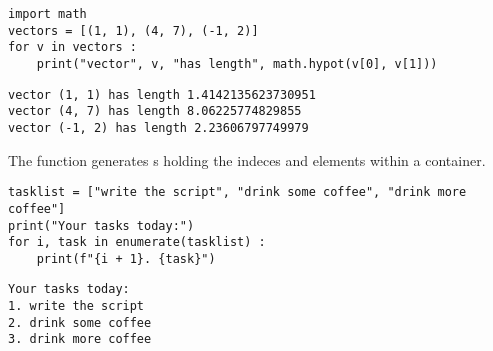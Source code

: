 
\begin{frame}[fragile]
%
\begin{codebox}
\begin{verbatim}
import math
vectors = [(1, 1), (4, 7), (-1, 2)]
for v in vectors :
    print("vector", v, "has length", math.hypot(v[0], v[1]))
\end{verbatim}
\end{codebox}
%
\begin{cmdbox}
\begin{verbatim}
vector (1, 1) has length 1.4142135623730951
vector (4, 7) has length 8.06225774829855
vector (-1, 2) has length 2.23606797749979
\end{verbatim}
\end{cmdbox}
%
\end{frame}


\begin{frame}[fragile]
%
\begin{hintbox}
The function  generates s holding the indeces and elements within a container.
\end{hintbox}
%
\begin{codebox}
\begin{verbatim}
tasklist = ["write the script", "drink some coffee", "drink more coffee"]
print("Your tasks today:")
for i, task in enumerate(tasklist) :
    print(f"{i + 1}. {task}")
\end{verbatim}
\end{codebox}
%
\begin{cmdbox}
\begin{verbatim}
Your tasks today:
1. write the script
2. drink some coffee
3. drink more coffee
\end{verbatim}
\end{cmdbox}
%
\end{frame}


